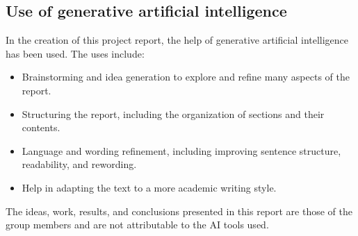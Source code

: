 \subsection{Use of generative artificial intelligence}

In the creation of this project report, the help of generative artificial intelligence has been used. The uses include:


\begin{itemize}
    \item Brainstorming and idea generation to explore and refine many aspects of the report.
    \item Structuring the report, including the organization of sections and their contents.
    \item Language and wording refinement, including improving sentence structure, readability, and rewording.
    \item Help in adapting the text to a more academic writing style.
\end{itemize}

The ideas, work, results, and conclusions presented in this report are those of the group members and are not attributable to the AI tools used.
